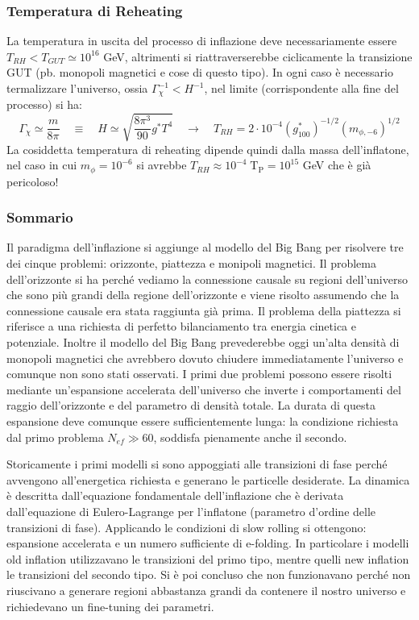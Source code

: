 \subsubsection{Temperatura di Reheating}
La temperatura in uscita del processo di inflazione deve necessariamente essere $T_{RH}<T_{GUT}\simeq 10^{16}$ GeV, altrimenti si riattraverserebbe ciclicamente la transizione GUT (pb. monopoli magnetici e cose di questo tipo). In ogni caso è necessario termalizzare l'universo, ossia $\Gamma_\chi^{-1}<H^{-1}$, nel limite (corrispondente alla fine del processo) si ha:
\begin{equation}
    \Gamma_\chi \simeq \frac{m}{8\pi} \quad\equiv\quad H \simeq \sqrt{\frac{8\pi^3}{90}g^* T^4}\quad \rightarrow \quad T_{RH} = 2\cdot 10^{-4} \left( g^*_{100} \right)^{-1/2} \left( m_{\phi, -6} \right)^{1/2}
\end{equation}
La cosiddetta temperatura di reheating dipende quindi dalla massa dell'inflatone, nel caso in cui $m_\phi = 10^{-6}$ si avrebbe $T_{RH}\approx 10^{-4}\;\mathrm{T_P}=10^{15}$ GeV che è già pericoloso! 

\newpage
\subsubsection{Sommario}
Il paradigma dell'inflazione si aggiunge al modello del Big Bang per risolvere tre dei cinque problemi: orizzonte, piattezza e monipoli magnetici. Il problema dell'orizzonte si ha perché vediamo la connessione causale su regioni dell'universo che sono più grandi della regione dell'orizzonte e viene risolto assumendo che la connessione causale era stata raggiunta già prima. Il problema della piattezza si riferisce a una richiesta di perfetto bilanciamento tra energia cinetica e potenziale. Inoltre il modello del Big Bang prevederebbe oggi un'alta densità di monopoli magnetici che avrebbero dovuto chiudere immediatamente l'universo e comunque non sono stati osservati. I primi due problemi possono essere risolti mediante un'espansione accelerata dell'universo che inverte i comportamenti del raggio dell'orizzonte e del parametro di densità totale. La durata di questa espansione deve comunque essere sufficientemente lunga: la condizione richiesta dal primo problema $N_{ef} \gg 60$, soddisfa pienamente anche il secondo. 

Storicamente i primi modelli si sono appoggiati alle transizioni di fase perché avvengono all'energetica richiesta e generano le particelle desiderate. La dinamica è descritta dall'equazione fondamentale dell'inflazione che è derivata dall'equazione di Eulero-Lagrange per l'inflatone (parametro d'ordine delle transizioni di fase). Applicando le condizioni di slow rolling si ottengono: espansione accelerata e un numero sufficiente di e-folding. In particolare i modelli old inflation utilizzavano le transizioni del primo tipo, mentre quelli new inflation le transizioni del secondo tipo. Si è poi concluso che non funzionavano perché non riuscivano a generare regioni abbastanza grandi da contenere il nostro universo e richiedevano un fine-tuning dei parametri.

